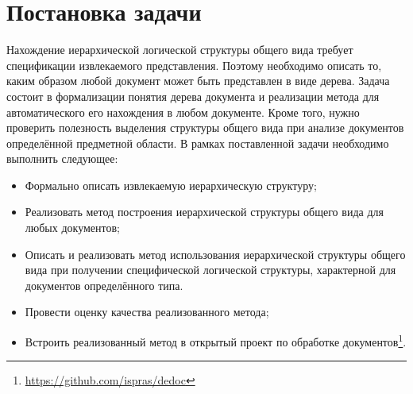 \section{Постановка задачи}
\label{sec:Chapter1} 

Нахождение иерархической логической структуры общего вида требует спецификации извлекаемого представления.
Поэтому необходимо описать то, каким образом любой документ может быть представлен в виде дерева.
Задача состоит в формализации понятия дерева документа и реализации метода для автоматического его нахождения в любом документе.
Кроме того, нужно проверить полезность выделения структуры общего вида при анализе документов определённой предметной области.
В рамках поставленной задачи необходимо выполнить следующее:
\begin{itemize}
    \item Формально описать извлекаемую иерархическую структуру;
    \item Реализовать метод построения иерархической структуры общего вида для любых документов;
    \item Описать и реализовать метод использования иерархической структуры общего вида при
    получении специфической логической структуры, характерной для документов определённого типа.
    \item Провести оценку качества реализованного метода;
    \item Встроить реализованный метод в открытый проект по обработке документов\footnote{\url{https://github.com/ispras/dedoc}}.
\end{itemize}